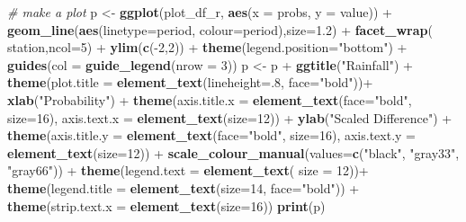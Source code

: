 \documentclass[]{article}
\newenvironment{Shaded}{\begin{snugshade}}{\end{snugshade}}
\newcommand{\KeywordTok}[1]{\textcolor[rgb]{0.13,0.29,0.53}{\textbf{{#1}}}}
\newcommand{\DataTypeTok}[1]{\textcolor[rgb]{0.13,0.29,0.53}{{#1}}}
\newcommand{\DecValTok}[1]{\textcolor[rgb]{0.00,0.00,0.81}{{#1}}}
\newcommand{\FloatTok}[1]{\textcolor[rgb]{0.00,0.00,0.81}{{#1}}}
\newcommand{\StringTok}[1]{\textcolor[rgb]{0.31,0.60,0.02}{{#1}}}
\newcommand{\CommentTok}[1]{\textcolor[rgb]{0.56,0.35,0.01}{\textit{{#1}}}}
\newcommand{\NormalTok}[1]{{#1}}
\begin{document}
\begin{Shaded}
\begin{Highlighting}[]
\CommentTok{# make a plot}
\NormalTok{p <-}\StringTok{ }\KeywordTok{ggplot}\NormalTok{(plot_df_r, }\KeywordTok{aes}\NormalTok{(}\DataTypeTok{x =} \NormalTok{probs, }\DataTypeTok{y =} \NormalTok{value)) +}
\StringTok{  }\KeywordTok{geom_line}\NormalTok{(}\KeywordTok{aes}\NormalTok{(}\DataTypeTok{linetype=}\NormalTok{period, }\DataTypeTok{colour=}\NormalTok{period),}\DataTypeTok{size=}\FloatTok{1.2}\NormalTok{) +}\StringTok{ }
\StringTok{  }\KeywordTok{facet_wrap}\NormalTok{(~}\StringTok{ }\NormalTok{station,}\DataTypeTok{ncol=}\DecValTok{5}\NormalTok{) +}\StringTok{ }\KeywordTok{ylim}\NormalTok{(}\KeywordTok{c}\NormalTok{(-}\DecValTok{2}\NormalTok{,}\DecValTok{2}\NormalTok{)) +}
\StringTok{  }\KeywordTok{theme}\NormalTok{(}\DataTypeTok{legend.position=}\StringTok{"bottom"}\NormalTok{) +}
\StringTok{  }\KeywordTok{guides}\NormalTok{(}\DataTypeTok{col =} \KeywordTok{guide_legend}\NormalTok{(}\DataTypeTok{nrow =} \DecValTok{3}\NormalTok{))}
\NormalTok{p <-}\StringTok{ }\NormalTok{p +}\StringTok{ }\KeywordTok{ggtitle}\NormalTok{(}\StringTok{"Rainfall"}\NormalTok{) +}
\StringTok{  }\KeywordTok{theme}\NormalTok{(}\DataTypeTok{plot.title =} \KeywordTok{element_text}\NormalTok{(}\DataTypeTok{lineheight=}\NormalTok{.}\DecValTok{8}\NormalTok{, }\DataTypeTok{face=}\StringTok{"bold"}\NormalTok{))+}
\StringTok{  }\KeywordTok{xlab}\NormalTok{(}\StringTok{"Probability"}\NormalTok{) +}
\StringTok{  }\KeywordTok{theme}\NormalTok{(}\DataTypeTok{axis.title.x =} \KeywordTok{element_text}\NormalTok{(}\DataTypeTok{face=}\StringTok{"bold"}\NormalTok{,  }\DataTypeTok{size=}\DecValTok{16}\NormalTok{),}
        \DataTypeTok{axis.text.x  =} \KeywordTok{element_text}\NormalTok{(}\DataTypeTok{size=}\DecValTok{12}\NormalTok{)) +}
\StringTok{  }\KeywordTok{ylab}\NormalTok{(}\StringTok{"Scaled Difference"}\NormalTok{) +}
\StringTok{  }\KeywordTok{theme}\NormalTok{(}\DataTypeTok{axis.title.y =} \KeywordTok{element_text}\NormalTok{(}\DataTypeTok{face=}\StringTok{"bold"}\NormalTok{,  }\DataTypeTok{size=}\DecValTok{16}\NormalTok{),}
        \DataTypeTok{axis.text.y  =} \KeywordTok{element_text}\NormalTok{(}\DataTypeTok{size=}\DecValTok{12}\NormalTok{)) +}
\StringTok{ }\KeywordTok{scale_colour_manual}\NormalTok{(}\DataTypeTok{values=}\KeywordTok{c}\NormalTok{(}\StringTok{"black"}\NormalTok{, }\StringTok{"gray33"}\NormalTok{, }\StringTok{"gray66"}\NormalTok{)) +}
\StringTok{  }\KeywordTok{theme}\NormalTok{(}\DataTypeTok{legend.text =} \KeywordTok{element_text}\NormalTok{( }\DataTypeTok{size =} \DecValTok{12}\NormalTok{))+}
\StringTok{  }\KeywordTok{theme}\NormalTok{(}\DataTypeTok{legend.title =} \KeywordTok{element_text}\NormalTok{(}\DataTypeTok{size=}\DecValTok{14}\NormalTok{, }\DataTypeTok{face=}\StringTok{"bold"}\NormalTok{)) +}
\StringTok{  }\KeywordTok{theme}\NormalTok{(}\DataTypeTok{strip.text.x =} \KeywordTok{element_text}\NormalTok{(}\DataTypeTok{size=}\DecValTok{16}\NormalTok{))}
\KeywordTok{print}\NormalTok{(p)}
\end{Highlighting}
\end{Shaded}
\end{document}

